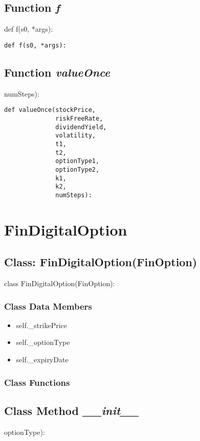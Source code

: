\documentclass[twoside,11pt]{book}
\begin{document}
\subsection{Function {\it f}}
def f(s0, *args):

\begin{lstlisting}
def f(s0, *args):
\end{lstlisting}

\subsection{Function {\it valueOnce}}
numSteps):

\begin{lstlisting}
def valueOnce(stockPrice,
              riskFreeRate,
              dividendYield,
              volatility,
              t1,
              t2,
              optionType1,
              optionType2,
              k1,
              k2,
              numSteps):
\end{lstlisting}

\newpage
\section{FinDigitalOption}

\subsection{Class: FinDigitalOption(FinOption)}
class FinDigitalOption(FinOption):

\subsubsection{Class Data Members}
\begin{itemize}
\item{self.\_strikePrice}
\item{self.\_optionType}
\item{self.\_expiryDate}
\end{itemize}

\subsubsection{Class Functions}

\subsection{Class Method {\it \_\_init\_\_}}
optionType):
\end{document}

